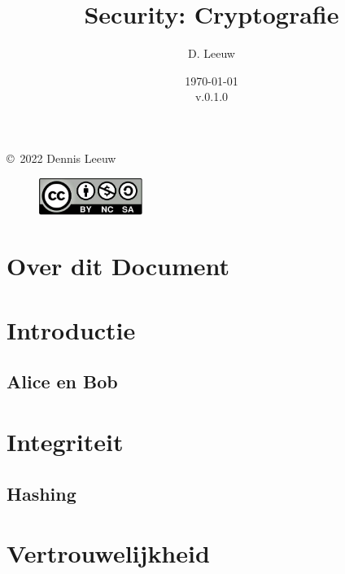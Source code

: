 \documentclass[a4paper,12pt,twoside,openright,titlepage]{book}
\author{D. Leeuw}
\title{Security: Cryptografie}
\date{\today\\v.0.1.0}
\begin{document}

\maketitle

\copyright\ 2022 Dennis Leeuw\\

\begin{figure}[H]
\includegraphics[width=0.3\textwidth]{CC-BY-SA-NC.png}
\end{figure}

\bigskip




\frontmatter
\chapter{Over dit Document}



\tableofcontents

\mainmatter

\chapter{Introductie}

\section{Alice en Bob}


\chapter{Integriteit}

\section{Hashing}


\chapter{Vertrouwelijkheid}

\end{document}
